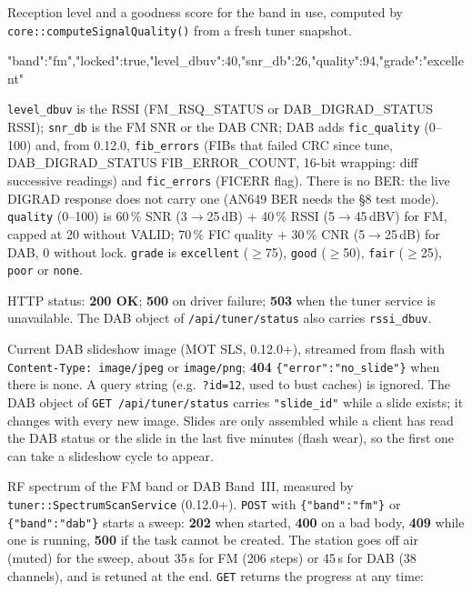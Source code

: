 \label{sec:api-tuner-signal}

Reception level and a goodness score for the band in use, computed by
\texttt{core::computeSignalQuality()} from a fresh tuner snapshot.

\begin{drnote}
\begin{drcode}[JSON]
{"band":"fm","locked":true,"level_dbuv":40,"snr_db":26,"quality":94,"grade":"excellent"}
\end{drcode}
\texttt{level\_dbuv} is the RSSI (FM\_RSQ\_STATUS or DAB\_DIGRAD\_STATUS
RSSI); \texttt{snr\_db} is the FM SNR or the DAB CNR; DAB adds
\texttt{fic\_quality} (0--100) and, from 0.12.0, \texttt{fib\_errors}
(FIBs that failed CRC since tune, DAB\_DIGRAD\_STATUS FIB\_ERROR\_COUNT,
16-bit wrapping: diff successive readings) and \texttt{fic\_errors}
(FICERR flag). There is no BER: the live DIGRAD response does not carry
one (AN649 BER needs the \S8 test mode). \texttt{quality} (0--100) is 60\,\% SNR
(3$\to$25\,dB) + 40\,\% RSSI (5$\to$45\,dB\textmu V) for FM, capped at 20
without VALID; 70\,\% FIC quality + 30\,\% CNR (5$\to$25\,dB) for DAB, 0
without lock. \texttt{grade} is \texttt{excellent} ($\geq$75),
\texttt{good} ($\geq$50), \texttt{fair} ($\geq$25), \texttt{poor} or
\texttt{none}.
\end{drnote}

HTTP status: \textbf{200 OK}; \textbf{500} on driver failure;
\textbf{503} when the tuner service is unavailable. The DAB object of
\texttt{/api/tuner/status} also carries \texttt{rssi\_dbuv}.

\label{sec:api-tuner-slide}

Current DAB slideshow image (MOT SLS, 0.12.0+), streamed from flash with
\texttt{Content-Type: image/jpeg} or \texttt{image/png};
\textbf{404} \texttt{\{"error":"no\_slide"\}} when there is none. A query
string (e.g.\ \texttt{?id=12}, used to bust caches) is ignored. The DAB
object of \texttt{GET /api/tuner/status} carries \texttt{"slide\_id"}
while a slide exists; it changes with every new image. Slides are only
assembled while a client has read the DAB status or the slide in the last
five minutes (flash wear), so the first one can take a slideshow cycle to
appear.

\label{sec:api-tuner-spectrum}

RF spectrum of the FM band or DAB Band~III, measured by
\texttt{tuner::SpectrumScanService} (0.12.0+). \texttt{POST} with
\texttt{\{"band":"fm"\}} or \texttt{\{"band":"dab"\}} starts a sweep:
\textbf{202} when started, \textbf{400} on a bad body, \textbf{409} while
one is running, \textbf{500} if the task cannot be created. The station
goes off air (muted) for the sweep, about 35\,s for FM (206 steps) or
45\,s for DAB (38 channels), and is retuned at the end. \texttt{GET}
returns the progress at any time:

